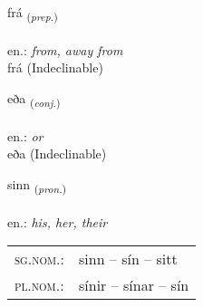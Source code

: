 \documentclass[frontgrid, backgrid]{flacards}\usepackage[]{graphicx}\usepackage[]{xcolor}
\begin{document}
{frá \small{\textsubscript{(\textit{prep.})}} \\[1ex]
\textphonetic{[frauː]} \\
en.: \emph{from, away from} \\  [2ex]
frá (Indeclinable)}


\renewcommand{\flhead}{\vskip5pt \fboxsep=0pt {\small\bfseries\footnotesize Samtenging | Conjuction}}
\renewcommand{\fcfoot}{\vskip5pt \fboxsep=0pt \hspace{2pt}{\small\bfseries\footnotesize 1K}}

\renewcommand{\blhead}{\vskip5pt {\small\bfseries\footnotesize Samtenging | Conjuction }}
\renewcommand{\bcfoot}{\vskip5pt \hspace{2pt}{\small\bfseries\footnotesize 1K}}


{eða \small{\textsubscript{(\textit{conj.})}} \\[1ex]
\textphonetic{[ɛːða]} \\
en.: \emph{or} \\  [2ex]
eða (Indeclinable)}

\renewcommand{\flhead}{\vskip5pt \fboxsep=0pt {\small\bfseries\footnotesize Fornafn | Pronoun}}
\renewcommand{\fcfoot}{\vskip5pt \fboxsep=0pt \hspace{2pt}{\small\bfseries\footnotesize 1K}}

\renewcommand{\blhead}{\vskip5pt {\small\bfseries\footnotesize Fornafn | Pronoun }}
\renewcommand{\bcfoot}{\vskip5pt \hspace{2pt}{\small\bfseries\footnotesize 1K}}


{sinn \small{\textsubscript{(\textit{pron.})}} \\[1ex] %
\textphonetic{[sɪn]} \\
en.: \emph{his, her, their} \\  [2ex]
\renewcommand*{\arraystretch}{0.8}
\begin{tabular}{ll}
\textsc{sg.nom.}: & sinn  --  sín -- sitt \\ 
\textsc{pl.nom.}: & sínir -- sínar -- sín
\end{tabular}
}
\end{document}
